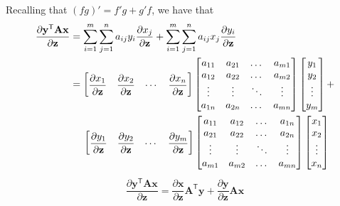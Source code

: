\documentclass{article}
\newcommand{\trans}{\mathsf{T}}
\begin{document}
Recalling that \((fg)' = f'g + g'f\), we have that
\begin{align}
    \dfrac{\partial \mathbf{y}^\trans \mathbf{A} \mathbf{x}}{\partial \mathbf{z}} & = \sum_{i = 1}^{m}\sum_{j = 1}^{n} a_{ij} y_{i} \dfrac{\partial x_{j}}{\partial \mathbf{z}} + \sum_{i = 1}^{m}\sum_{j = 1}^{n} a_{ij} x_{j} \dfrac{\partial y_{i}}{\partial \mathbf{z}} \\
    & = \begin{bmatrix}
        \dfrac{\partial x_1}{\partial \mathbf{z}} & \dfrac{\partial x_2}{\partial \mathbf{z}} & \cdots & \dfrac{\partial x_n}{\partial \mathbf{z}}
    \end{bmatrix}
    \begin{bmatrix}
        a_{11} & a_{21} & \dots & a_{m1} \\
        a_{12} & a_{22} & \dots & a_{m2} \\
        \vdots & \vdots & \ddots & \vdots \\
        a_{1n} & a_{2n} & \dots & a_{mn} \\
    \end{bmatrix}
    \begin{bmatrix}
        y_1 \\
        y_2 \\
        \vdots \\
        y_m
    \end{bmatrix} + \\
    & \hspace{3ex} \begin{bmatrix}
        \dfrac{\partial y_1}{\partial \mathbf{z}} & \dfrac{\partial y_2}{\partial \mathbf{z}} & \cdots & \dfrac{\partial y_m}{\partial \mathbf{z}}
    \end{bmatrix}
    \begin{bmatrix}
        a_{11} & a_{12} & \dots & a_{1n} \\
        a_{21} & a_{22} & \dots & a_{2n} \\
        \vdots & \vdots & \ddots & \vdots \\
        a_{m1} & a_{m2} & \dots & a_{mn} \\
    \end{bmatrix}
    \begin{bmatrix}
        x_1 \\
        x_2 \\
        \vdots \\
        x_n
    \end{bmatrix}
\end{align}
\begin{align}
    \boxed{\dfrac{\partial \mathbf{y}^\trans \mathbf{A} \mathbf{x}}{\partial \mathbf{z}} = \dfrac{\partial \mathbf{x}}{\partial \mathbf{z}} \mathbf{A}^{\trans} \mathbf{y} + \dfrac{\partial \mathbf{y}}{\partial \mathbf{z}} \mathbf{A} \mathbf{x}}
\end{align}
\end{document}

